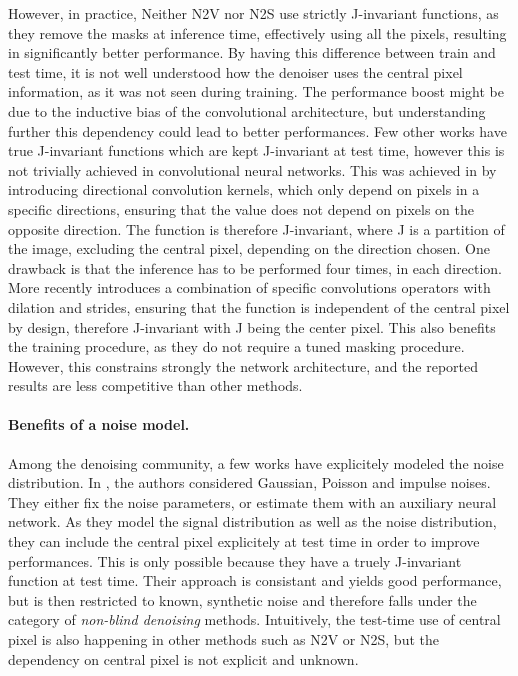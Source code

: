 \documentclass{article}
\begin{document}
However, in practice, Neither N2V nor N2S use strictly J-invariant functions, as they remove the masks at inference time,
effectively using all the pixels, resulting in significantly better performance. By having this difference between train and test time, it is not well understood how the denoiser uses the central pixel information, as it was not seen during training. The performance boost might be due to the inductive bias of the convolutional architecture, but understanding further this dependency could lead to better performances.
Few other works have true J-invariant functions which are kept J-invariant at test time, however this is not trivially achieved in convolutional neural networks. This was achieved in \cite{laine2019high} by introducing directional convolution kernels, which only depend on pixels in a specific directions, ensuring that the value does not depend on pixels on the opposite direction. The function is therefore J-invariant, where J is a partition of the image, excluding the central pixel, depending on the direction chosen. One drawback is that the inference has to be performed four times, in each direction.
More recently \cite{lee2020noise2kernel} introduces a combination of specific convolutions operators with dilation and strides, ensuring that the function is independent of the central pixel by design, therefore J-invariant with J being the center pixel. This also benefits the training procedure, as they do not require a tuned masking procedure. However, this constrains strongly the network architecture, and the reported results are less competitive than other methods.

\paragraph{Benefits of a noise model.}
Among the denoising community, a few works have explicitely modeled the noise distribution. In \cite{laine2019high}, the authors considered Gaussian, Poisson and impulse noises.
They either fix the noise parameters, or estimate them with an auxiliary neural network.
As they model the signal distribution as well as the noise distribution, they can include the central pixel explicitely at test time in order to improve performances. This is only possible because they have a truely J-invariant function at test time. Their approach is consistant and yields good performance, but is then restricted to known, synthetic noise and therefore falls under the category of \textit{non-blind denoising} methods.
Intuitively, the test-time use of central pixel is also happening in other methods such as N2V or N2S, but the dependency on central pixel is not explicit and unknown.
\end{document}
